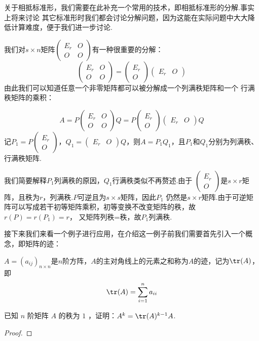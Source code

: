 关于相抵标准形，我们需要在此补充一个常用的技术，即相抵标准形的分解.事实上将来讨论
其它标准形时我们都会讨论分解问题，因为这能在实际问题中大大降低计算难度，便于我们进一步讨论.

我们对$s \times n$矩阵$\begin{pmatrix}
    E_r & O \\ O & O
\end{pmatrix}$有一种很重要的分解：
\[\begin{pmatrix}
    E_r & O \\ O & O
\end{pmatrix}=\begin{pmatrix}
    E_r \\ O
\end{pmatrix}\begin{pmatrix}
    E_r & O
\end{pmatrix}\]
由此我们可以知道任意一个非零矩阵都可以被分解成一个列满秩矩阵和一个
行满秩矩阵的乘积：

\[A=P\begin{pmatrix}
    E_r & O \\ O & O
\end{pmatrix}Q=P\begin{pmatrix}
    E_r \\ O
\end{pmatrix}\begin{pmatrix}
    E_r & O
\end{pmatrix}Q\]
记$P_1=P\begin{pmatrix}
    E_r \\ O
\end{pmatrix}$，$Q_1=\begin{pmatrix}
    E_r & O
\end{pmatrix}Q$，则$A=P_1Q_1$，且$P_1$和$Q_1$分别为列满秩、行满秩矩阵.

我们简要解释$P_1$列满秩的原因，$Q_1$行满秩类似不再赘述.由于
$\begin{pmatrix}
    E_r \\ O
\end{pmatrix}$是$s\times r$矩阵，且秩为$r$，列满秩.$P$可逆且为$s\times s$矩阵，因此$P_1$
仍然是$s\times r$矩阵.由于可逆矩阵可以写成若干初等矩阵乘积，初等变换不改变矩阵的秩，故$r(P)=r(P_1)=r$，
又矩阵列秩=秩，故$P_1$列满秩.

接下来我们来看一个例子进行应用，在介绍这一例子前我们需要首先引入一个概念，即矩阵的迹：
\begin{definition}
    $A=(a_{ij})_{n\times n}$是$n$阶方阵，$A$的主对角线上的元素之和称为$A$的迹，记为$\tr(A)$，即
    \[\tr(A)=\sum_{i=1}^n a_{ii}\]
\end{definition}
\begin{example}\label{ex:11:相抵分解}
    已知 $n$ 阶矩阵 $A$ 的秩为 $1$ ，证明：$A^k=\tr(A)^{k-1}A$.
\end{example}
\begin{proof}

\end{proof}

